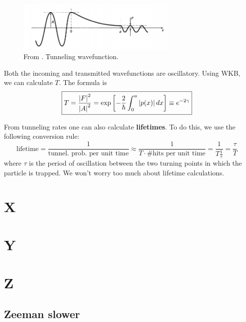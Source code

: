 \documentclass{book}
\theoremstyle{definition}
\newcommand{\f}[2]{\frac{#1}{#2}}
\newcommand{\lb}{\left[}
\newcommand{\rb}{\right]}
\begin{document}
\begin{figure}[!htb]
	\centering
	\includegraphics[width=0.7\textwidth]{images/wkb_6}
	\caption{From \cite{griffiths2018introduction}. Tunneling wavefunction.}
\end{figure}


Both the incoming and transmitted wavefunctions are oscillatory. Using WKB, we can calculate $T$. The formula is 
\begin{equation*}
\boxed{T = \f{\abs{F}^2}{\abs{A}^2}   = \exp\lb -\f{2}{\hbar} \int_0^a \abs{p(x)}\,dx \rb \equiv e^{-2\gamma}}
\end{equation*}

From tunneling rates one can also calculate \textbf{lifetimes}. To do this, we use the following conversion rule:
\begin{equation*}
\text{lifetime} = \f{1}{\text{tunnel. prob. per unit time}} \approx \f{1}{T \cdot \text{\# hits per unit time}} = \f{1}{T \f{1}{\tau}} = \f{\tau}{T}
\end{equation*}
where $\tau$ is the period of oscillation between the two turning points in which the particle is trapped. We won't worry too much about lifetime calculations.


\chapter*{X}
\chapter*{Y}
\chapter*{Z}



\section*{Zeeman slower}






\newpage

 

\end{document}
